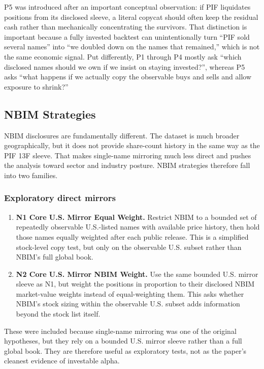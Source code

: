 \documentclass[conference]{IEEEtran}
\begin{document}
P5 was introduced after an important conceptual observation: if PIF liquidates positions from its disclosed sleeve, a literal copycat should often keep the residual cash rather than mechanically concentrating the survivors. That distinction is important because a fully invested backtest can unintentionally turn ``PIF sold several names'' into ``we doubled down on the names that remained,'' which is not the same economic signal. Put differently, P1 through P4 mostly ask ``which disclosed names should we own if we insist on staying invested?'', whereas P5 asks ``what happens if we actually copy the observable buys and sells and allow exposure to shrink?''

\subsection{NBIM Strategies}

NBIM disclosures are fundamentally different. The dataset is much broader geographically, but it does not provide share-count history in the same way as the PIF 13F sleeve. That makes single-name mirroring much less direct and pushes the analysis toward sector and industry posture. NBIM strategies therefore fall into two families.

\subsubsection{Exploratory direct mirrors}
\begin{enumerate}[leftmargin=1.4em]
    \item \textbf{N1 Core U.S. Mirror Equal Weight.} Restrict NBIM to a bounded set of repeatedly observable U.S.-listed names with available price history, then hold those names equally weighted after each public release. This is a simplified stock-level copy test, but only on the observable U.S. subset rather than NBIM's full global book.
    \item \textbf{N2 Core U.S. Mirror NBIM Weight.} Use the same bounded U.S. mirror sleeve as N1, but weight the positions in proportion to their disclosed NBIM market-value weights instead of equal-weighting them. This asks whether NBIM's stock sizing within the observable U.S. subset adds information beyond the stock list itself.
\end{enumerate}

These were included because single-name mirroring was one of the original hypotheses, but they rely on a bounded U.S. mirror sleeve rather than a full global book. They are therefore useful as exploratory tests, not as the paper's cleanest evidence of investable alpha.
\end{document}
